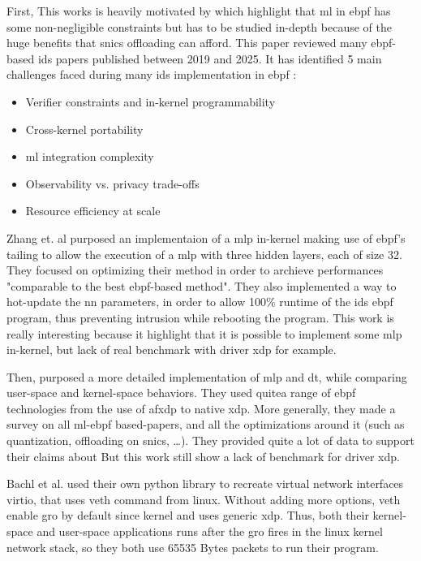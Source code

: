 \documentclass[conference]{IEEEtran}
\begin{document}
First, This works is heavily motivated by \cite{rajurkar_packets_2025} which highlight that \gls{ml} in \gls{ebpf} has some non-negligible constraints but has to be studied in-depth because of the huge benefits that \gls{snic}s offloading can afford. This paper reviewed many \gls{ebpf}-based \gls{ids} papers published between 2019 and 2025. It has identified 5 main challenges faced during many \gls{ids} implementation in \gls{ebpf} :
\begin{itemize}
    \item Verifier constraints and in-kernel programmability
    \item Cross-kernel portability
    \item \gls{ml} integration complexity
    \item Observability vs. privacy trade-offs
    \item Resource efficiency at scale
\end{itemize}

Zhang et. al \cite{zhang_real-time_2024} purposed an implementaion of a \gls{mlp} in-kernel making use of \gls{ebpf}'s tailing to allow the execution of a \gls{mlp} with three hidden layers, each of size 32. They focused on optimizing their method in order to archieve performances "comparable to the best \gls{ebpf}-based method".
They also implemented a way to hot-update the \gls{nn} parameters, in order to allow 100\% runtime of the \gls{ids} \gls{ebpf} program, thus preventing intrusion while rebooting the program.
This work is really interesting because it highlight that it is possible to implement some \gls{mlp} in-kernel, but lack of real benchmark with driver \gls{xdp} for example.

Then, \cite{hara_practicality_2024} purposed a more detailed implementation of \gls{mlp} and \gls{dt}, while comparing user-space and kernel-space behaviors. They used quitea range of \gls{ebpf} technologies \: from the use of \gls{afxdp} to native \gls{xdp}. More generally, they made a survey on all \gls{ml}-\gls{ebpf} based-papers, and all the optimizations around it (such as quantization, offloading on \gls{snic}s, \dots). They provided quite a lot of data to support their claims about But this work still show a lack of benchmark for driver \gls{xdp}.

Bachl et al. \cite{bachl_flow-based_2022} used their own python library to recreate virtual network interfaces virtio, that uses veth command from linux. Without adding more options, veth enable \gls{gro} by default since kernel  and uses generic \gls{xdp}. Thus, both their kernel-space and user-space applications runs after the \gls{gro} fires in the linux kernel network stack, so they both use 65535 Bytes packets to run their program.
\end{document}
